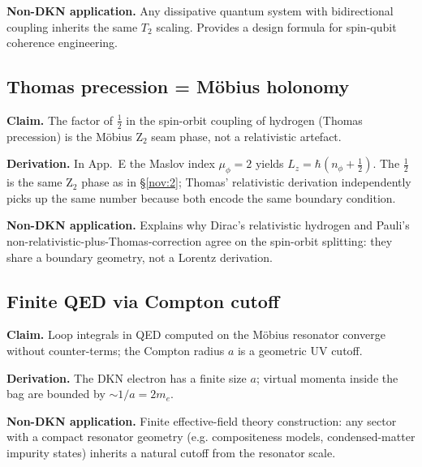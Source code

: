 \documentclass[11pt,a4paper]{article}
\theoremstyle{definition}
\begin{document}
\begin{tcolorbox}[applbox]
\textbf{Non-DKN application.}
Any dissipative quantum system with bidirectional coupling inherits
the same $T_2$ scaling. Provides a design formula for spin-qubit
coherence engineering.
\end{tcolorbox}

\subsection{Thomas precession = M\"obius holonomy}\label{nov:21}

\begin{tcolorbox}[noveltybox]
\textbf{Claim.} The factor of $\tfrac12$ in the spin-orbit coupling
of hydrogen (Thomas precession) is the M\"obius Z$_2$ seam phase, not
a relativistic artefact.
\end{tcolorbox}

\textbf{Derivation.} In \cite{Knopp2026} App.~E the Maslov index
$\mu_\phi = 2$ yields $L_z = \hbar(n_\phi + \tfrac12)$. The
$\tfrac12$ is the same Z$_2$ phase as in \S\ref{nov:2}; Thomas'
relativistic derivation independently picks up the same number because
both encode the same boundary condition.

\begin{tcolorbox}[applbox]
\textbf{Non-DKN application.}
Explains why Dirac's relativistic hydrogen and Pauli's
non-relativistic-plus-Thomas-correction agree on the spin-orbit
splitting: they share a boundary geometry, not a Lorentz derivation.
\end{tcolorbox}

\subsection{Finite QED via Compton cutoff}\label{nov:22}

\begin{tcolorbox}[noveltybox]
\textbf{Claim.} Loop integrals in QED computed on the M\"obius
resonator converge without counter-terms; the Compton radius $a$ is a
geometric UV cutoff.
\end{tcolorbox}

\textbf{Derivation.} The DKN electron has a finite size $a$; virtual
momenta inside the bag are bounded by $\sim 1/a = 2m_e$.

\begin{tcolorbox}[applbox]
\textbf{Non-DKN application.}
Finite effective-field theory construction: any sector with a compact
resonator geometry (e.g. compositeness models, condensed-matter
impurity states) inherits a natural cutoff from the resonator scale.
\end{tcolorbox}
\end{document}
